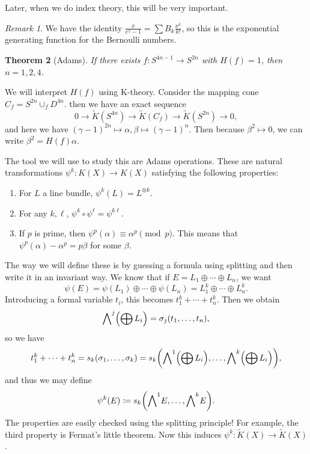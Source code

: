 \documentclass[leqno, openany]{memoir}
\newtheorem{thm}{Theorem}[section]
\theoremstyle{definition}
\theoremstyle{remark}
\newtheorem{rmk}[thm]{Remark}
\theoremstyle{plain}
\theoremstyle{definition}
\theoremstyle{remark}
\newcommand{\wt}[1]{\widetilde{#1}}
\begin{document}
Later, when we do index theory, this will be very important.

\begin{rmk}
    We have the identity $\frac{x}{e^x - 1} = \sum B_k \frac{x^k}{k!}$, so this is the exponential generating function for the Bernoulli numbers.
\end{rmk}

\begin{thm}[Adams]
    If there exists $f \colon S^{4n-1} \to S^{2n}$ with $H(f) = 1$, then $n = 1,2,4$.
\end{thm}

We will interpret $H(f)$ using K-theory. Consider the mapping cone $C_f = S^{2n} \cup_f D^{4n}$. then we have an exact sequence
\[ 0 \to \wt{K}(S^{4n}) \to \wt{K}(C_f) \to \wt{K}(S^{2n}) \to 0, \]
and here we have ${(\gamma-1)}^{2n} \mapsto \alpha, \beta \mapsto {(\gamma-1)}^n$. Then because $\beta^2 \mapsto 0$, we can write $\beta^2 = H(f) \alpha$.

The tool we will use to study this are Adams operations. These are natural transformations $\psi^k \colon K(X) \to K(X)$ satisfying the following properties:
\begin{enumerate}
    \item For $L$ a line bundle, $\psi^k(L) = L^{\otimes k}$.
    \item For any $k, \ell$, $\psi^k \circ \psi^{\ell} = \psi^{k\ell}$.
    \item If $p$ is prime, then $\psi^p(\alpha) \equiv \alpha^p \pmod p$. This means that $\psi^p(\alpha) - \alpha^p = p\beta$ for some $\beta$.
\end{enumerate}

The way we will define these is by guessing a formula using splitting and then write it in an invariant way. We know that if $E = L_1 \oplus \cdots \oplus L_n$, we want
\[ \psi(E) = \psi(L_1) \oplus \cdots \oplus \psi(L_n) = L_1^k \oplus \cdots \oplus L_n^k. \]
Introducing a formal variable $t_i$, this becomes $t_1^k + \cdots + t_n^k$. Then we obtain
\[ {\bigwedge}^j\qty(\bigoplus L_i) = \sigma_j(t_1, \ldots, t_n), \]
so we have 
\[ t_1^k + \cdots + t_n^k = s_k(\sigma_1, \ldots, \sigma_k) = s_k \qty({\bigwedge}^1\qty(\bigoplus L_i), \ldots, {\bigwedge}^k \qty(\bigoplus L_i)), \]
and thus we may define
\[ \psi^k(E) \coloneqq s_k \qty({\bigwedge}^1 E, \ldots, {\bigwedge}^k E). \]
The properties are easily checked using the splitting principle! For example, the third property is Fermat's little theorem. Now this induces $\psi^k \colon \wt{K}(X) \to \wt{K}(X)$.
\end{document}
